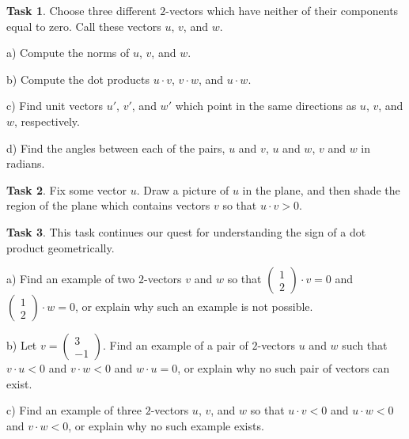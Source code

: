 \documentclass{tufte-book}
\theoremstyle{definition}
\newtheorem{task}{Task}
\begin{document}
\begin{task}
Choose three different $2$-vectors which have neither of their components equal to zero. Call these vectors $u$, $v$, and $w$.
\begin{compactitem}
\item[a)] Compute the norms of $u$, $v$, and $w$.
\item[b)] Compute the dot products $u\cdot v$, $v\cdot w$, and $u\cdot w$.
\item[c)] Find unit vectors $u'$, $v'$, and $w'$ which point in the same directions as $u$, $v$, and $w$, respectively.
\item[d)] Find the angles between each of the pairs, $u$ and $v$, $u$ and $w$, $v$ and $w$ in radians.
\end{compactitem}
\end{task}



\begin{task}
Fix some vector $u$. Draw a picture of $u$ in the plane, and then shade the region of the plane which contains vectors $v$ so that $u\cdot v> 0$.
\end{task}



\begin{task} This task continues our quest for understanding the sign of a dot product geometrically.
\begin{compactitem}
\item[a)] Find an example of two $2$-vectors $v$ and $w$ so that $\left(\begin{smallmatrix}1 \\ 2 \end{smallmatrix}\right)\cdot v =0$ and $\left(\begin{smallmatrix}1 \\ 2 \end{smallmatrix}\right)\cdot w = 0$, or explain why such an example is not possible.

\item[b)] Let $v = \left(\begin{smallmatrix}3\\-1 \end{smallmatrix}\right)$. Find an example of a pair of $2$-vectors $u$ and $w$ such that $v \cdot u < 0$ and $v \cdot w < 0$ and $w \cdot u = 0$, or explain why no such pair of vectors can exist.

\item[c)] Find an example of three $2$-vectors $u$, $v$, and $w$ so that $u \cdot v < 0$ and $u\cdot w < 0$ and $v \cdot w < 0$, or explain why no such example exists.
\end{compactitem}
\end{task}
\end{document}
